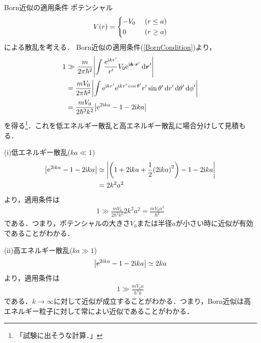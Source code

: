 \documentclass{report}
\begin{document}
 \begin{myex}{Born近似の適用条件}{}
  ポテンシャル
  \begin{align}
    V(r) = \begin{dcases}
      -V_0\ &(r \leq a)\\
      0\ &(r \geq a)
    \end{dcases}
  \end{align}
  による散乱を考える．
  Born近似の適用条件(\ref{BornCondition})より，
  \begin{align}
    1 &\gg \frac{m}{2\pi \hbar^2}\abs{\int \frac{\mathrm{e}^{\mathrm{i} kr'}}{r'}V_0\mathrm{e}^{\mathrm{i}\bm{k}\cdot\bm{r}'}\dd{\bm{r}'}}\\
    &= \frac{mV_0}{2\pi \hbar^2}\abs{\int \mathrm{e}^{\mathrm{i} kr'}\mathrm{e}^{\mathrm{i} kr'\cos \theta'}r'\sin\theta' \dd{r'}\dd{\theta'}\dd{\phi'}}\\
    &= \frac{mV_0}{2\hbar^2 k^2}\abs{\mathrm{e}^{2\mathrm{i} ka} - 1 - 2\mathrm{i} ka}
  \end{align}
  を得る\footnote{「試験に出そうな計算．」}．これを低エネルギー散乱と高エネルギー散乱に場合分けして見積もる．

  (i)低エネルギー散乱($ka \ll 1$)
  \begin{align}
    \abs{\mathrm{e}^{2\mathrm{i} ka} - 1 - 2\mathrm{i} ka} &\simeq \abs{\qty(1 + 2\mathrm{i} ka + \frac{1}{2}\qty(2 \mathrm{i} ka)^2) - 1 - 2\mathrm{i} ka}\\
    &= 2k^2 a^2
  \end{align}
  より，適用条件は
  \begin{align}
    1 \gg \frac{mV_0}{2 \hbar^2 k^2}2k^2 a^2 = \frac{mV_0 a^2}{\hbar^2}
  \end{align}
  である．つまり，ポテンシャルの大きさ$V_0$または半径$a$が小さい時に近似が有効であることがわかる．

  (ii)高エネルギー散乱($ka \gg 1$)
  \begin{align}
    \abs{\mathrm{e}^{2\mathrm{i} ka} - 1 - 2\mathrm{i} ka} \simeq 2ka
  \end{align}
  より，適用条件は
  \begin{align}
    1 \gg \frac{mV_0 a}{\hbar^2 k}
  \end{align}
  である．$k\to\infty$に対して近似が成立することがわかる．つまり，Born近似は高エネルギー粒子に対して常によい近似であることがわかる．
 \end{myex}
\end{document}
